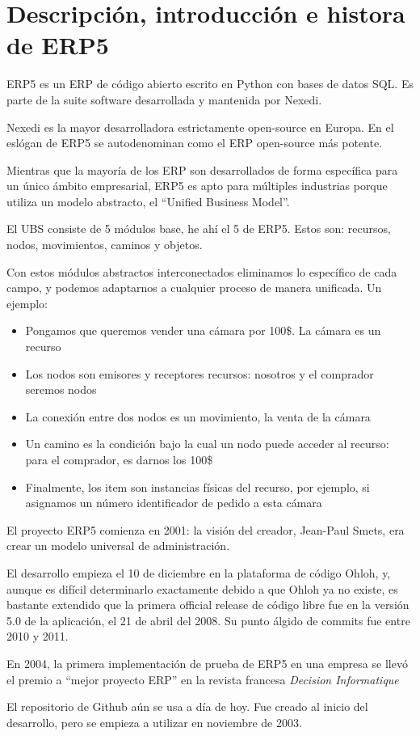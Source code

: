 \chapter{Descripción, introducción e histora de ERP5}
ERP5 es un ERP de código abierto escrito en Python con bases de datos SQL. Es parte de la suite software desarrollada y mantenida por Nexedi. 

Nexedi es la mayor desarrolladora estrictamente open-source en Europa. En el eslógan de ERP5 se autodenominan como el ERP open-source más potente.  

Mientras que la mayoría de los ERP son desarrollados de forma específica para un único ámbito empresarial, ERP5 es apto para múltiples industrias porque utiliza un modelo abstracto, el “Unified Business Model”.


El UBS consiste de 5 módulos base, he ahí el 5 de ERP5. Estos son: recursos, nodos, movimientos, caminos y objetos.

Con estos módulos abstractos interconectados eliminamos lo específico de cada campo, y podemos adaptarnos a cualquier proceso de manera unificada. Un ejemplo: 
\begin{itemize}
	\item Pongamos que queremos vender una cámara por 100\$. La cámara es un recurso
	\item Los nodos son emisores y receptores recursos: nosotros y el comprador seremos nodos
	\item La conexión entre dos nodos es un movimiento, la venta de la cámara
	\item Un camino es la condición bajo la cual un nodo puede acceder al recurso: para el comprador, es darnos los 100\$
	\item Finalmente, los item son instancias físicas del recurso, por ejemplo, si asignamos un número identificador de pedido a esta cámara
\end{itemize}

El proyecto ERP5 comienza en 2001: la visión del creador, Jean-Paul Smets, era crear un modelo universal de administración.

El desarrollo empieza el 10 de diciembre en la plataforma de código Ohloh, y, aunque es difícil determinarlo exactamente debido a que Ohloh ya no existe, es bastante extendido que la primera official release de código libre fue en la versión 5.0 de la aplicación, el 21 de abril del 2008. Su punto álgido de commits fue entre 2010 y 2011.

En 2004, la primera implementación de prueba de ERP5 en una empresa se llevó el premio a “mejor proyecto ERP” en la revista francesa \textit{Decision Informatique}

El repositorio de Github aún se usa a día de hoy. Fue creado al inicio del desarrollo, pero se empieza a utilizar en noviembre de 2003.
